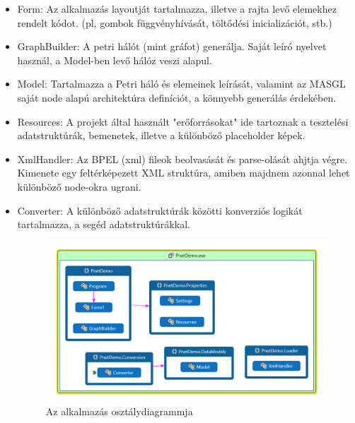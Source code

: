 \begin{itemize}
\item Form: Az alkalmazás layoutját tartalmazza, illetve a rajta levő elemekhez rendelt kódot. (pl, gombok függvényhívását, töltődési inicializációt, stb.)
\item GraphBuilder: A petri hálót (mint gráfot) generálja. Saját leíró nyelvet használ, a Model-ben levő hálóz veszi alapul.
\item Model: Tartalmazza a Petri háló és elemeinek leírását, valamint az MASGL saját node alapú architektúra definíciót, a könnyebb generálás érdekében.
\item Resources: A projekt által használt "erőforrásokat" ide tartoznak a tesztelési adatstruktúrák, bemenetek, illetve a különböző placeholder képek. 
\item XmlHandler: Az BPEL (xml) fileok beolvasását és parse-olását ahjtja végre. Kimenete egy feltérképezett XML struktúra, amiben majdnem azonnal lehet különböző node-okra ugrani. 
\item Converter: A különböző adatstruktúrák közötti konverziós logikát tartalmazza, a segéd adatstruktúrákkal. 

\begin{figure}[h!]
\centering
\includegraphics[scale=0.5]{images/Classdiagram.png}
\caption{Az alkalmazás osztálydiagrammja  }
\label{fig:assign}
\end{figure}


\end{itemize}
